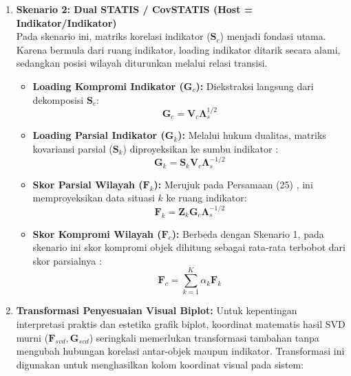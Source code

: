 \begin{enumerate}[label=\arabic*.]
    \item \textbf{Skenario 2: Dual STATIS / CovSTATIS (Host = Indikator/Indikator)} \\
    Pada skenario ini, matriks korelasi indikator ($\mathbf{S}_c$) menjadi fondasi utama. Karena bermula dari ruang indikator, loading indikator ditarik secara alami, sedangkan posisi wilayah diturunkan melalui relasi transisi.
    \begin{itemize}
        \item \textbf{Loading Kompromi Indikator ($\mathbf{G}_c$):} Diekstraksi langsung dari dekomposisi $\mathbf{S}_c$:
        \begin{equation}\label{eq:loading_kompromi_s2}
            \mathbf{G}_c = \mathbf{V}_c \mathbf{\Lambda}_s^{1/2}
        \end{equation}
        \item \textbf{Loading Parsial Indikator ($\mathbf{G}_k$):} Melalui hukum dualitas, matriks kovariansi parsial ($\mathbf{S}_k$) diproyeksikan ke sumbu indikator \citep{lavit94}:
        \begin{equation}\label{eq:loading_parsial_s2}
            \mathbf{G}_k = \mathbf{S}_k \mathbf{V}_c \mathbf{\Lambda}_s^{-1/2}
        \end{equation}
        \item \textbf{Skor Parsial Wilayah ($\mathbf{F}_k$):} Merujuk pada Persamaan (25) \citet{abdi2012}, ini memproyeksikan data situasi $k$ ke ruang indikator:
        \begin{equation}\label{eq:skor_parsial_s2}
            \mathbf{F}_k = \mathbf{Z}_k \mathbf{G}_c \mathbf{\Lambda}_s^{-1/2}
        \end{equation}
        \item \textbf{Skor Kompromi Wilayah ($\mathbf{F}_c$):} Berbeda dengan Skenario 1, pada skenario ini skor kompromi objek dihitung sebagai rata-rata terbobot dari skor parsialnya \citep{lavit94}:
        \begin{equation}\label{eq:skor_kompromi_s2}
            \mathbf{F}_c = \sum_{k=1}^K \alpha_k \mathbf{F}_k
        \end{equation}
    \end{itemize}

    \item \label{enum:transformasi_visual_biplot}\textbf{Transformasi Penyesuaian Visual Biplot:} Untuk kepentingan interpretasi praktis dan estetika grafik biplot, koordinat matematis hasil SVD murni ($\mathbf{F}_{svd}, \mathbf{G}_{svd}$) seringkali memerlukan transformasi tambahan tanpa mengubah hubungan korelasi antar-objek maupun indikator. Transformasi ini digunakan untuk menghasilkan kolom koordinat visual pada sistem:
    

\end{enumerate}
